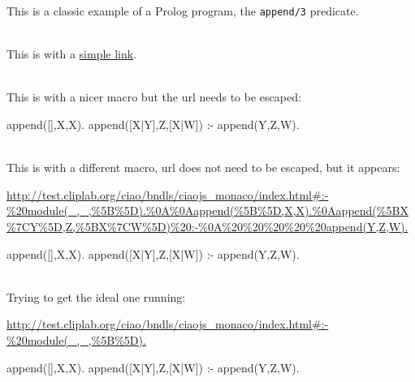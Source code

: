\documentclass{article}
\begin{document}
\noindent
This is a classic example of a Prolog program, the \texttt{append/3} predicate.

\ \\
This is with a  \href{http://test.cliplab.org/ciao/bndls/ciaojs_monaco/index.html#:-%20module(_,_,%5B%5D).%0A%0Aappend(%5B%5D,X,X).%0Aappend(%5BX%7CY%5D,Z,%5BX%7CW%5D)%20:-%0A%20%20%20%20%20append(Y,Z,W).}{simple link}.

\ \\
This is with a nicer macro but the url needs to be escaped: 
%
\def\purlesc{http://test.cliplab.org/ciao/bndls/ciaojs\_monaco/index.html\#:-\%20module(\_,\_,\%5B\%5D).\%0A\%0Aappend(\%5B\%5D,X,X).\%0Aappend(\%5BX\%7CY\%5D,Z,\%5BX\%7CW\%5D)\%20:-\%0A\%20\%20\%20\%20\%20append(Y,Z,W).}
%
\begin{prologrunesc}
append([],X,X).
append([X|Y],Z,[X|W]) :-
     append(Y,Z,W).
\end{prologrunesc}

\ \\
This is with a different macro, url does not need to be escaped, but
it appears:

\runurlshow\url{http://test.cliplab.org/ciao/bndls/ciaojs_monaco/index.html#:-%20module(_,_,%5B%5D).%0A%0Aappend(%5B%5D,X,X).%0Aappend(%5BX%7CY%5D,Z,%5BX%7CW%5D)%20:-%0A%20%20%20%20%20append(Y,Z,W).}
\begin{prologrunshow}
append([],X,X).
append([X|Y],Z,[X|W]) :-
     append(Y,Z,W).
\end{prologrunshow}

\ \\
Trying to get the ideal one running:

\runurl\url{http://test.cliplab.org/ciao/bndls/ciaojs_monaco/index.html#:-%20module(_,_,%5B%5D).}
\begin{prologrun}
append([],X,X).
append([X|Y],Z,[X|W]) :-
     append(Y,Z,W).
\end{prologrun}







\end{document}
